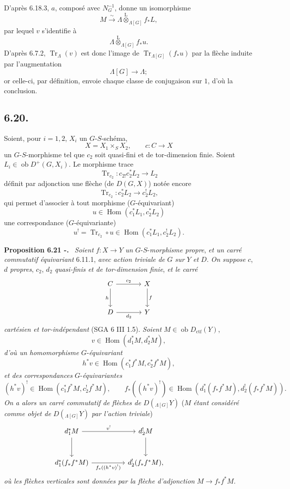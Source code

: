 \documentclass[11pt]{article}
\newenvironment{statement}[1]{\par\medskip\noindent\textbf{#1.}\ }{\par\medskip}
\DeclareMathOperator{\Hom}{Hom}
\providecommand{\Tr}{\operatorname{Tr}}
\providecommand{\Tr}{\operatorname{Tr}}
\providecommand{\lten}{\overset{\mathrm L}{\otimes}}
\providecommand{\Ob}{\operatorname{ob}}
\providecommand{\Tr}{\operatorname{Tr}}
\providecommand{\Hom}{\operatorname{Hom}}
\providecommand{\lten}{\overset{\mathrm L}{\otimes}}
\providecommand{\lten}{\overset{\mathrm L}{\otimes}}
\providecommand{\Ob}{\operatorname{ob}}
\providecommand{\Tr}{\operatorname{Tr}}
\providecommand{\lten}{\overset{\mathrm L}{\otimes}}
\providecommand{\lten}{\overset{\mathrm L}{\otimes}}
\providecommand{\Ob}{\operatorname{Ob}}
\providecommand{\lten}{\overset{\mathrm L}{\otimes}}
\providecommand{\Hom}{\operatorname{Hom}}
\providecommand{\Tr}{\operatorname{Tr}}
\providecommand{\Ob}{\operatorname{ob}}
\providecommand{\Ob}{\operatorname{Ob}}
\providecommand{\lten}{\overset{\mathrm L}{\otimes}}
\begin{document}
D'après 6.18.3, $a$,
composé avec $N_G^{-1}$, donne un isomorphisme
\[
M\xrightarrow{\sim}\Lambda\lten_{\Lambda[G]}f_*L,
\]
par lequel $v$ s'identifie à
\[
\Lambda\lten_{\Lambda[G]}f_*u.
\]
D'après 6.7.2, $\Tr_{\Lambda}(v)$ est donc l'image de $\Tr_{\Lambda[G]}(f_*u)$ par la flèche induite par l'augmentation
\[
\Lambda[G]\longrightarrow \Lambda;
\]
or celle-ci, par définition, envoie chaque classe de conjugaison sur $1$, d'où la conclusion.

\subsection*{6.20.}
Soient, pour $i=1,2$, $X_i$ un $G$-$S$-schéma,
\[
X=X_1\times_SX_2,\qquad c:C\to X
\]
un $G$-$S$-morphisme tel que $c_2$ soit quasi-fini et de tor-dimension finie. Soient $L_i\in\Ob D^+(G,X_i)$. Le morphisme trace
\[
\Tr_{c_2}:c_{2!}c_2^*L_2\longrightarrow L_2
\]
définit par adjonction une flèche (de $D(G,X)$) notée encore
\begin{equation}
\Tr_{c_2}:c_2^*L_2\longrightarrow c_2^!L_2,
\tag{6.20.1}
\end{equation}
qui permet d'associer à tout morphisme ($G$-équivariant)
\[
u\in\Hom(c_1^*L_1,c_2^*L_2)
\]
une correspondance ($G$-équivariante)
\begin{equation}
u^! = \Tr_{c_2}\circ u\in\Hom(c_1^*L_1,c_2^!L_2).
\tag{6.20.2}
\end{equation}

\begin{statement}{Proposition 6.21 -}
\emph{Soient} $f:X\to Y$ \emph{un} $G$-$S$-\emph{morphisme propre}, \emph{et un carré commutatif équivariant} 6.11.1, \emph{avec action triviale de} $G$ \emph{sur} $Y$ \emph{et} $D$. \emph{On suppose} $c$, $d$ \emph{propres}, $c_2$, $d_2$ \emph{quasi-finis et de tor-dimension finie}, \emph{et le carré}
\[
\begin{tikzcd}[column sep=large,row sep=large]
C \arrow[r,"c_2"] \arrow[d,"h"'] & X \arrow[d,"f"]\\
D \arrow[r,"d_2"'] & Y
\end{tikzcd}
\]
\emph{cartésien et tor-indépendant} (SGA 6 III 1.5). \emph{Soient} $M\in\Ob D_{\mathrm{ctf}}(Y)$,
\[
v\in\Hom(d_1^*M,d_2^*M),
\]
\emph{d'où un homomorphisme} $G$-\emph{équivariant}
\[
h^*v\in\Hom(c_1^*f^*M,c_2^*f^*M),
\]
\emph{et des correspondances} $G$-\emph{équivariantes}
\[
(h^*v)^!\in\Hom(c_1^*f^*M,c_2^!f^*M),
\qquad
f_*((h^*v)^!)\in\Hom(d_1^*(f_*f^*M),d_2^!(f_*f^*M)).
\]
\emph{On a alors un carré commutatif de flèches de} $D({}_{\Lambda[G]}Y)$ ($M$ \emph{étant considéré comme objet de} $D({}_{\Lambda[G]}Y)$ \emph{par l'action triviale})
\[
\begin{tikzcd}[column sep=huge,row sep=large]
d_1^*M \arrow[r,"v^!"] \arrow[d] & d_2^!M \arrow[d] & {}\\
d_1^*(f_*f^*M) \arrow[r,"f_*((h^*v)^!)"'] & d_2^!(f_*f^*M),
\end{tikzcd}
\]
\emph{où les
flèches verticales sont données par la flèche d'adjonction} $M\to f_*f^*M$.
\end{statement}
\end{document}
